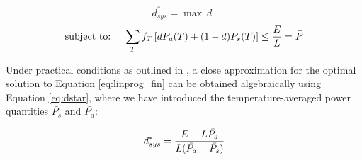 \begin{equation}
\label{eq:linprog_fin}
d_{sys}^* = \max ~{d}~~
\end{equation}
\begin{align*}
\text{subject to:~~~~}  \sum_Tf_T\left[dP_a(T) + (1-d)P_s(T)\right] \le {E\over L} = \bar{P}
\end{align*}


Under practical conditions as outlined in \cite{Wanner:2012}, a close approximation for the optimal solution to Equation \ref{eq:linprog_fin} can be obtained algebraically using Equation \ref{eq:dstar}, where we have introduced the temperature-averaged power quantities $\bar{P_s}$ and $\bar{P_a}$:

\begin{equation}
\label{eq:dstar}
d_{sys}^* =  { E - L\bar{P_s} \over L(\bar{P_a} -\bar{P_s}) } 
\end{equation}


